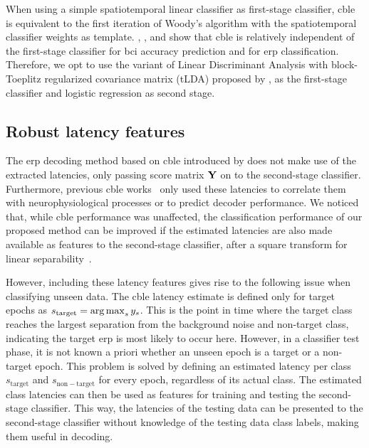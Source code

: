 When using a simple spatiotemporal linear classifier as first-stage classifier,
\ac{cble} is equivalent to the first iteration of Woody's algorithm with the
spatiotemporal classifier weights as template.
\textcite{Thompson2012}, \textcite{Mowla2017}, and \textcite{Mowla2020} show
that \ac{cble} is relatively independent of the first-stage classifier for \ac{bci}
accuracy prediction and for \ac{erp} classification.
Therefore, we opt to use the variant of Linear Discriminant Analysis with block-Toeplitz
regularized covariance matrix (tLDA) proposed by \textcite{Sosulski2022}, as the first-stage
classifier and logistic regression as second stage.

\subsection{Robust latency features}
\label{sec:robust-latency}
The \ac{erp} decoding method based on \ac{cble} introduced by \textcite{Mowla2017} does
not make use of the extracted latencies, only passing score matrix $\mathbf{Y}$ on
to the second-stage classifier.
Furthermore, previous \ac{cble} works~\cite{Thompson2012, Mowla2020} only used these
latencies to correlate them with neurophysiological processes or to predict
decoder performance.
We noticed that, while \ac{cble} performance was unaffected, the classification
performance of our proposed method can be improved if the estimated
latencies are also made available as features to the second-stage classifier,
after a square transform for linear separability~\cite{Thompson2012}.

However, including these latency features gives rise to the following issue when
classifying unseen data.
The \ac{cble} latency estimate is defined only for target epochs as
$s_\mathrm{target}=\operatorname*{arg\,max}_s{y_s}$.
This is the point in time where the target class reaches the largest separation
from the background noise and non-target class, indicating the target \ac{erp} is
most likely to occur here.
However, in a classifier test phase, it is not known a priori whether an
unseen epoch is a target or a non-target epoch.
This problem is solved by defining an estimated latency per class
$s_\mathrm{target}$ and $s_\mathrm{non-target}$ for every epoch,
regardless of its actual class.
The estimated class latencies can then be used as features for training and
testing the second-stage classifier.
This way, the latencies of the testing data can be presented to the second-stage
classifier without knowledge of the testing data class labels, making them
useful in decoding.

